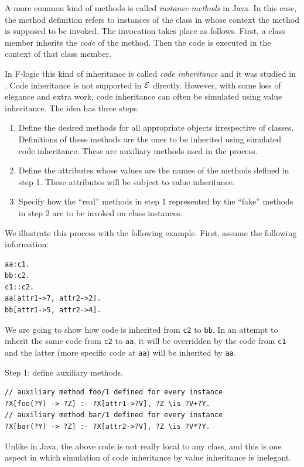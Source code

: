 \documentclass[11pt]{article}
\newcommand{\ERGO}{\mbox{\ensuremath{\cal{E}}\smaller{{\sc{RGO}}}}\xspace}
\newcommand{\FLSYSTEM}{\ERGO}
\newcommand{\fl}{\mbox{F-logic}\xspace}
\begin{document}
A more common kind of methods is called \emph{instance methods} in Java.
In this case, the method definition refers to instances of the class in
whose context the method is supposed to be invoked. The invocation takes
place as follows. First, a class member inherits the \emph{code} of the
method. Then the code is executed in the context of that class member.

In \fl this kind of inheritance is called \emph{code inheritance} and it was
studied in \cite{code-inheritance-2003,kifer-yang-inheritance-2006}. Code inheritance is not 
supported in \FLSYSTEM directly. However, with some loss of
elegance and extra work, code inheritance can often be simulated using value
inheritance. The idea has three steps.
\begin{enumerate}
\item  Define the desired methods for all appropriate objects irrespective of
  classes. Definitions of these methods are the ones to be inherited using
  simulated code inheritance. These are auxiliary methods used in the
  process.
\item Define the attributes whose values are the names of the methods defined
  in step 1.  These attributes will be subject to value inheritance.
\item  Specify how the ``real'' methods in step 1 represented by
  the ``fake'' methods in step 2 are to be invoked on class instances.
\end{enumerate}
We illustrate this process with the following example. First, assume the
following information:
\begin{verbatim}
aa:c1.
bb:c2.
c1::c2.
aa[attr1->7, attr2->2].
bb[attr1->5, attr2->4].  
\end{verbatim}
We are going to show how code is inherited from {\tt c2} to {\tt bb}. In
an attempt to inherit the same code from {\tt c2} to {\tt aa}, it
will be overridden by the code from {\tt c1} and the latter (more specific
code at \texttt{aa})  will be inherited
by {\tt aa}. 

\noindent
Step 1: define auxiliary methods.
\begin{verbatim}
// auxiliary method foo/1 defined for every instance
?X[foo(?Y) -> ?Z] :- ?X[attr1->?V], ?Z \is ?V+?Y.
// auxiliary method bar/1 defined for every instance
?X[bar(?Y) -> ?Z] :- ?X[attr2->?V], ?Z \is ?V*?Y.  
\end{verbatim}
Unlike in Java, the above code is not really local to any class, and this is
one aspect in which simulation of code inheritance by value inheritance is
inelegant.
\end{document}
